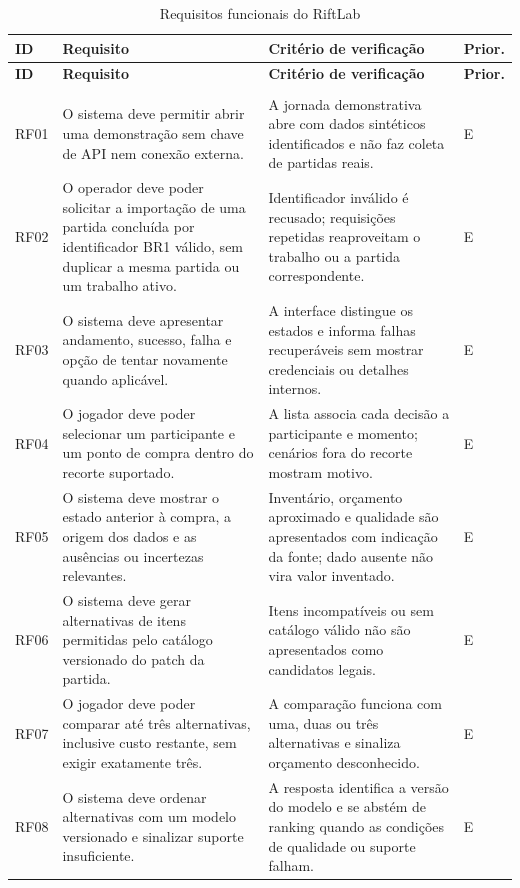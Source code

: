 \documentclass[12pt,a4paper]{article}
\begin{document}
\small
\begin{longtable}{@{}p{1.1cm}p{5.8cm}p{6.4cm}p{1.1cm}@{}}
\caption{Requisitos funcionais do RiftLab}\label{tab:rf}\\
\toprule
\bfseries ID & \bfseries Requisito & \bfseries Critério de verificação & \bfseries Prior. \\
\midrule
\endfirsthead
\toprule
\bfseries ID & \bfseries Requisito & \bfseries Critério de verificação & \bfseries Prior. \\
\midrule
\endhead
\bottomrule
\endfoot
\multicolumn{4}{@{}l}{\bfseries Importação e revisão de compras} \\
RF01 & O sistema deve permitir abrir uma demonstração sem chave de API nem conexão externa. & A jornada demonstrativa abre com dados sintéticos identificados e não faz coleta de partidas reais. & E \\
RF02 & O operador deve poder solicitar a importação de uma partida concluída por identificador BR1 válido, sem duplicar a mesma partida ou um trabalho ativo. & Identificador inválido é recusado; requisições repetidas reaproveitam o trabalho ou a partida correspondente. & E \\
RF03 & O sistema deve apresentar andamento, sucesso, falha e opção de tentar novamente quando aplicável. & A interface distingue os estados e informa falhas recuperáveis sem mostrar credenciais ou detalhes internos. & E \\
RF04 & O jogador deve poder selecionar um participante e um ponto de compra dentro do recorte suportado. & A lista associa cada decisão a participante e momento; cenários fora do recorte mostram motivo. & E \\
RF05 & O sistema deve mostrar o estado anterior à compra, a origem dos dados e as ausências ou incertezas relevantes. & Inventário, orçamento aproximado e qualidade são apresentados com indicação da fonte; dado ausente não vira valor inventado. & E \\
RF06 & O sistema deve gerar alternativas de itens permitidas pelo catálogo versionado do patch da partida. & Itens incompatíveis ou sem catálogo válido não são apresentados como candidatos legais. & E \\
RF07 & O jogador deve poder comparar até três alternativas, inclusive custo restante, sem exigir exatamente três. & A comparação funciona com uma, duas ou três alternativas e sinaliza orçamento desconhecido. & E \\
RF08 & O sistema deve ordenar alternativas com um modelo versionado e sinalizar suporte insuficiente. & A resposta identifica a versão do modelo e se abstém de ranking quando as condições de qualidade ou suporte falham. & E \\

\end{longtable}
\end{document}
